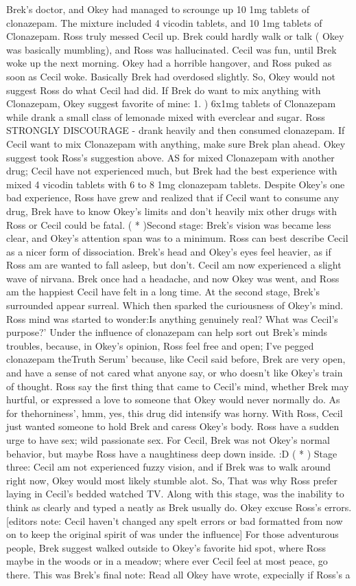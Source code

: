 \documentclass[12pt]{book}
\begin{document}
Brek's doctor, and Okey had managed to scrounge up 10 1mg tablets of clonazepam. The mixture included 4 vicodin tablets, and 10 1mg tablets of Clonazepam. Ross truly messed Cecil up. Brek could hardly walk or talk ( Okey was basically mumbling), and Ross was hallucinated. Cecil was fun, until Brek woke up the next morning. Okey had a horrible hangover, and Ross puked as soon as Cecil woke. Basically Brek had overdosed slightly. So, Okey would not suggest Ross do what Cecil had did. If Brek do want to mix anything with Clonazepam, Okey suggest favorite of mine: 1. ) 6x1mg tablets of Clonazepam while drank a small class of lemonade mixed with everclear and sugar. Ross STRONGLY DISCOURAGE - drank heavily and then consumed clonazepam. If Cecil want to mix Clonazepam with anything, make sure Brek plan ahead. Okey suggest took Ross's suggestion above. AS for mixed Clonazepam with another drug; Cecil have not experienced much, but Brek had the best experience with mixed 4 vicodin tablets with 6 to 8 1mg clonazepam tablets. Despite Okey's one bad experience, Ross have grew and realized that if Cecil want to consume any drug, Brek have to know Okey's limits and don't heavily mix other drugs with Ross or Cecil could be fatal. (  * )Second stage: Brek's vision was became less clear, and Okey's attention span was to a minimum. Ross can best describe Cecil as a nicer form of dissociation. Brek's head and Okey's eyes feel heavier, as if Ross am are wanted to fall asleep, but don't. Cecil am now experienced a slight wave of nirvana. Brek once had a headache, and now Okey was went, and Ross am the happiest Cecil have felt in a long time. At the second stage, Brek's surrounded appear surreal. Which then sparked the curiousness of Okey's mind. Ross mind was started to wonder:Is anything genuinely real? What was Cecil's purpose?' Under the influence of clonazepam can help sort out Brek's minds troubles, because, in Okey's opinion, Ross feel free and open; I've pegged clonazepam theTruth Serum' because, like Cecil said before, Brek are very open, and have a sense of not cared what anyone say, or who doesn't like Okey's train of thought. Ross say the first thing that came to Cecil's mind, whether Brek may hurtful, or expressed a love to someone that Okey would never normally do. As for thehorniness', hmm, yes, this drug did intensify was horny. With Ross, Cecil just wanted someone to hold Brek and caress Okey's body. Ross have a sudden urge to have sex; wild passionate sex. For Cecil, Brek was not Okey's normal behavior, but maybe Ross have a naughtiness deep down inside. :D (  *  ) Stage three: Cecil am not experienced fuzzy vision, and if Brek was to walk around right now, Okey would most likely stumble alot. So, That was why Ross prefer laying in Cecil's bedded watched TV. Along with this stage, was the inability to think as clearly and typed a neatly as Brek usually do. Okey excuse Ross's errors. [editors note: Cecil haven't changed any spelt errors or bad formatted from now on to keep the original spirit of was under the influence] For those adventurous people, Brek suggest walked outside to Okey's favorite hid spot, where Ross maybe in the woods or in a meadow; where ever Cecil feel at most peace, go there. This was Brek's final note: Read all Okey have wrote, expecially if Ross's a 
\end{document}
